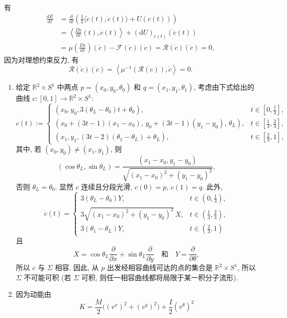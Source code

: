 \begin{description}[font=\normalfont,leftmargin=2em,labelwidth=1.5em]
有
\begin{align*}
  \frac{\mathrm{d}E}{\mathrm{d}t}
  &=\frac{\mathrm{d}}{\mathrm{d}t}\left(\frac12\langle\dot c(t),\dot c(t)\rangle+U(c(t))\right)\\
  &=\left\langle\frac{D\dot c}{\mathrm{d}t}(t),\dot c(t)\right\rangle
      +(\mathrm{d}U)_{c(t)}(\dot c(t))\\
  &=\mu\left(\frac{D\dot c}{\mathrm{d}t}\right)(\dot c)-\mathcal F(\dot c)(\dot c)
    =\mathcal R(\dot c)(\dot c)=0,
\end{align*}
因为对理想约束反力, 有
\[
  \mathcal R(\dot c)(\dot c)=\left\langle\mu^{-1}(\mathcal R(\dot c)),\dot c\right\rangle=0.
\]

\begin{enumerate}[label=(\alph*),ref=\alph*,leftmargin=*]
\item 给定 $\mathbb{R}^2\times S^1$ 中两点 $p=(x_0,y_0,\theta_0)$ 和 $q=(x_1,y_1,\theta_1)$, 考虑由下式给出的曲线 $c:[0,1]\to\mathbb{R}^2\times S^1$:
\[
  c(t):=
  \begin{cases}
   (x_0,y_0,3(\theta_L-\theta_0)t+\theta_0), & t\in[0,\tfrac13],\\
   (x_0+(3t-1)(x_1-x_0),\,y_0+(3t-1)(y_1-y_0),\,\theta_L), & t\in[\tfrac13,\tfrac23],\\
   (x_1,y_1,(3t-2)(\theta_1-\theta_L)+\theta_L), & t\in[\tfrac23,1],
  \end{cases}
\]
其中, 若 $(x_0,y_0)\ne(x_1,y_1)$, 则
\[
  (\cos\theta_L,\sin\theta_L)=\frac{(x_1-x_0,y_1-y_0)}{\sqrt{(x_1-x_0)^2+(y_1-y_0)^2}},
\]
否则 $\theta_L=\theta_0$. 显然 $c$ 连续且分段光滑, $c(0)=p$, $c(1)=q$. 此外,
\[
  \dot c(t)=
  \begin{cases}
    3(\theta_L-\theta_0)Y, & t\in(0,\tfrac13),\\
    3\sqrt{(x_1-x_0)^2+(y_1-y_0)^2}\,X, & t\in(\tfrac13,\tfrac23),\\
    3(\theta_1-\theta_L)Y, & t\in(\tfrac23,1)
  \end{cases}
\]
且
\[
  X=\cos\theta_L\frac{\partial}{\partial x}+\sin\theta_L\frac{\partial}{\partial y}
  \quad\text{和}\quad Y=\frac{\partial}{\partial\theta},
\]
所以 $c$ 与 $\Sigma$ 相容. 因此, 从 $p$ 出发经相容曲线可达的点的集合是 $\mathbb{R}^2\times S^1$, 所以 $\Sigma$ 不可能可积 (若 $\Sigma$ 可积, 则任一相容曲线都将局限于某一积分子流形).
\item 因为动能由
\[
  K=\frac M2\bigl((v^x)^2+(v^y)^2\bigr)+\frac I2(v^\theta)^2
\]
\end{enumerate}
\end{description}
